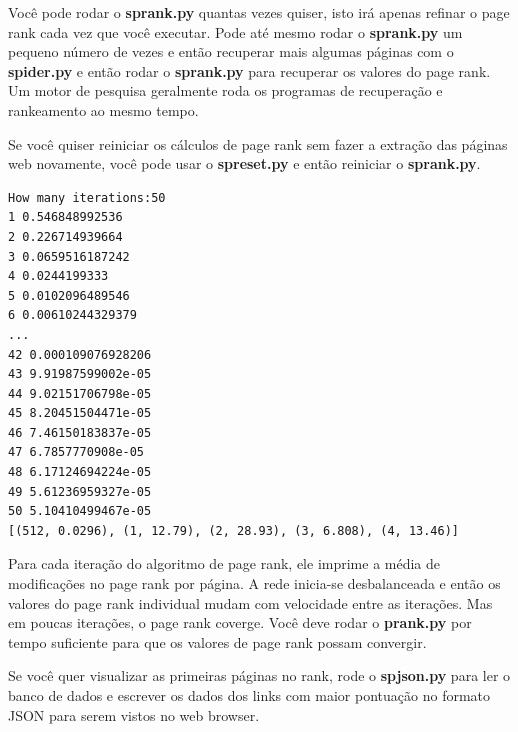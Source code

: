 Você pode rodar o {\bf sprank.py} quantas vezes quiser, isto irá apenas refinar
o page rank cada vez que você executar. Pode até mesmo rodar o {\bf sprank.py} um
pequeno número de vezes e então recuperar mais algumas páginas com o {\bf spider.py} 
e então rodar o {\bf sprank.py} para recuperar os valores do page rank. Um motor de
pesquisa geralmente roda os programas de recuperação e rankeamento ao mesmo tempo.

Se você quiser reiniciar os cálculos de page rank sem fazer a extração das páginas
web novamente, você pode usar o {\bf spreset.py} e então reiniciar o {\bf sprank.py}.

\beforeverb
\begin{verbatim}
How many iterations:50
1 0.546848992536
2 0.226714939664
3 0.0659516187242
4 0.0244199333
5 0.0102096489546
6 0.00610244329379
...
42 0.000109076928206
43 9.91987599002e-05
44 9.02151706798e-05
45 8.20451504471e-05
46 7.46150183837e-05
47 6.7857770908e-05
48 6.17124694224e-05
49 5.61236959327e-05
50 5.10410499467e-05
[(512, 0.0296), (1, 12.79), (2, 28.93), (3, 6.808), (4, 13.46)]
\end{verbatim}
\afterverb
%

Para cada iteração do algoritmo de page rank, ele imprime a média
de modificações no page rank por página. A rede inicia-se
desbalanceada e então os valores do page rank individual mudam
com velocidade entre as iterações. Mas em poucas iterações, o page rank 
coverge. Você deve rodar o {\bf prank.py} por tempo suficiente para
que os valores de page rank possam convergir.

Se você quer visualizar as primeiras páginas no rank, rode o {\bf spjson.py}
para ler o banco de dados e escrever os dados dos links com maior pontuação
no formato JSON para serem vistos no web browser.

